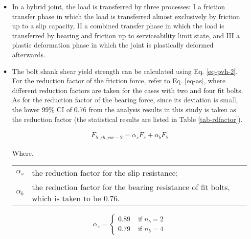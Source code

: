 \begin{itemize}

\item In a hybrid joint, the load is transferred by three processes: \RN{1} a friction transfer phase in which the load is transferred almost exclusively by friction up to a slip capacity, \RN{2} a combined transfer phase in which the load is transferred by bearing  and friction up to serviceability limit state, and \RN{3} a plastic deformation phase in which the joint is plastically deformed afterwards. 

\item The bolt shank shear yield strength can be calculated using Eq. \ref{eq-pvh-2}. For the reduction factor of the friction force, refer to Eq. \ref{eq-as}, where different reduction factors are taken for the cases with two and four fit bolts. As for the reduction factor of the bearing force, since its deviation is small, the lower 99\% CI of 0.76 from the analysis results in this study is taken as the reduction factor (the statistical results are listed in Table \ref{tab-rdfactor}). 

\begin{equation}
    \begin{aligned}
        F_{h,sh,cor-2} = \alpha_s F_s+\alpha_{b} F_b
    \end{aligned}
    \label{eq-pvh-2}
\end{equation}

Where,

\begin{tabularx}{0.95\linewidth}{ l X }
$\alpha_s$ & the reduction factor for the slip resistance;\\ 
$\alpha_b$ & the reduction factor for the bearing resistance of fit bolts, which is taken to be 0.76.\\
\end{tabularx}

\begin{equation}
\alpha_s =
\begin{cases} 
0.89 & \text { if } n_b = 2 \\ 
0.79 & \text { if } n_b = 4
\end{cases}
\label{eq-as}
\end{equation}


\end{itemize}
